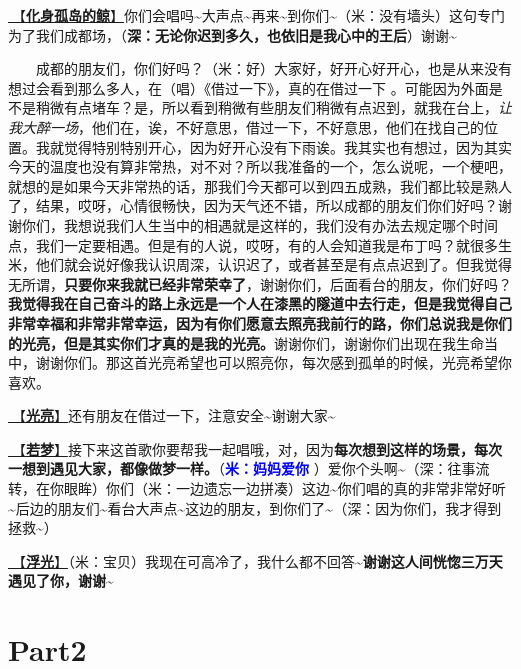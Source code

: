 \documentclass[]{ctexbook}
\begin{document}
\hyperref[hua-shen-gu-dao-de-jing]{🎵【\textbf{化身孤岛的鲸}】}你们会唱吗\textasciitilde 大声点\textasciitilde 再来\textasciitilde 到你们\textasciitilde（米：没有墙头）这句专门为了我们成都场，（\textbf{深：无论你迟到多久，也依旧是我心中的王后}）谢谢\textasciitilde{}

  成都的朋友们，你们好吗？（米：好）大家好，好开心好开心，也是从来没有想过会看到那么多人，在（唱）《借过一下》，真的在借过一下 。可能因为外面是不是稍微有点堵车？是，所以看到稍微有些朋友们稍微有点迟到，就我在台上，\emph{让我大醉一场}，他们在，诶，不好意思，借过一下，不好意思，他们在找自己的位置。我就觉得特别特别开心，因为好开心没有下雨诶。我其实也有想过，因为其实今天的温度也没有算非常热，对不对？所以我准备的一个，怎么说呢，一个梗吧，就想的是如果今天非常热的话，那我们今天都可以到四五成熟，我们都比较是熟人了，结果，哎呀，心情很畅快，因为天气还不错，所以成都的朋友们你们好吗？谢谢你们，我想说我们人生当中的相遇就是这样的，我们没有办法去规定哪个时间点，我们一定要相遇。但是有的人说，哎呀，有的人会知道我是布丁吗？就很多生米，他们就会说好像我认识周深，认识迟了，或者甚至是有点点迟到了。但我觉得无所谓，\textbf{只要你来我就已经非常荣幸了}，谢谢你们，后面看台的朋友，你们好吗？\textbf{我觉得我在自己奋斗的路上永远是一个人在漆黑的隧道中去行走，但是我觉得自己非常幸福和非常非常幸运，因为有你们愿意去照亮我前行的路，你们总说我是你们的光亮，但是其实你们才真的是我的光亮。}谢谢你们，谢谢你们出现在我生命当中，谢谢你们。那这首光亮希望也可以照亮你，每次感到孤单的时候，光亮希望你喜欢。

\hyperref[silver-linings]{🎵【\textbf{光亮}】}还有朋友在借过一下，注意安全\textasciitilde 谢谢大家\textasciitilde{}

\hyperref[ruomeng]{🎵【\textbf{若梦}】}接下来这首歌你要帮我一起唱哦，对，因为\textbf{每次想到这样的场景，每次一想到遇见大家，都像做梦一样。}（\textbf{\textcolor{blue}{米：妈妈爱你} }）爱你个头啊\textasciitilde（深：往事流转，在你眼眸）你们（米：一边遗忘一边拼凑）这边\textasciitilde 你们唱的真的非常非常好听\textasciitilde 后边的朋友们\textasciitilde 看台大声点\textasciitilde 这边的朋友，到你们了\textasciitilde（深：因为你们，我才得到拯救\textasciitilde）

\hyperref[floating-light]{🎵【\textbf{浮光}】}（米：宝贝）我现在可高冷了，我什么都不回答\textasciitilde{}\textbf{谢谢这人间恍惚三万天遇见了你，谢谢\textasciitilde{}}

\section{Part2}\label{chengdu-20240615-part2}
\end{document}
